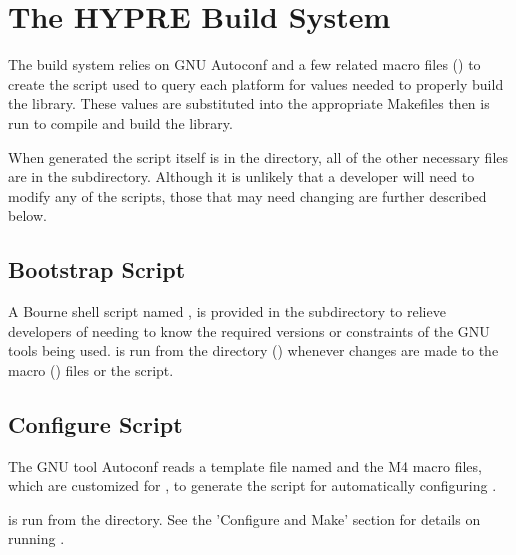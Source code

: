 
\chapter{The HYPRE Build System}
\label{The HYPRE Build System}


The \hypre{} build system relies on GNU Autoconf and a few related macro files () to 
create the  script used to query each platform for values needed to properly build 
the library. These values are substituted into the appropriate Makefiles then  is
run to compile and build the library.

When generated the  script itself is in the  directory, 
all of the other necessary files are in the  subdirectory. Although it is unlikely 
that a developer will need to modify any of the scripts, those that may need changing are further
described below.

\section{Bootstrap Script}
\label{Bootstrap Script}

A Bourne shell script named , is provided in the  subdirectory
to relieve developers of needing to know the required versions or constraints of the GNU 
tools being used.   is run from the  directory 
() whenever changes are made to the macro () files or 
the  script.

\section{Configure Script}
\label{Configure Script}

The GNU tool Autoconf reads a template file named  and the M4 macro files,
which are customized for \hypre{}, to generate the  script for automatically 
configuring \hypre{}.

 is run from the  directory. See the 'Configure and Make'
section for details on running .

